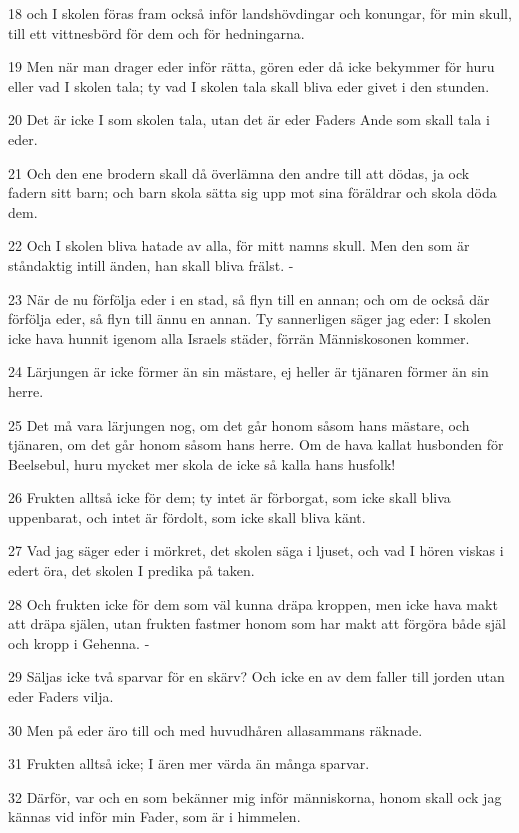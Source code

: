 \par 18 och I skolen föras fram också inför landshövdingar och konungar, för min skull, till ett vittnesbörd för dem och för hedningarna.
\par 19 Men när man drager eder inför rätta, gören eder då icke bekymmer för huru eller vad I skolen tala; ty vad I skolen tala skall bliva eder givet i den stunden.
\par 20 Det är icke I som skolen tala, utan det är eder Faders Ande som skall tala i eder.
\par 21 Och den ene brodern skall då överlämna den andre till att dödas, ja ock fadern sitt barn; och barn skola sätta sig upp mot sina föräldrar och skola döda dem.
\par 22 Och I skolen bliva hatade av alla, för mitt namns skull. Men den som är ståndaktig intill änden, han skall bliva frälst. -
\par 23 När de nu förfölja eder i en stad, så flyn till en annan; och om de också där förfölja eder, så flyn till ännu en annan. Ty sannerligen säger jag eder: I skolen icke hava hunnit igenom alla Israels städer, förrän Människosonen kommer.
\par 24 Lärjungen är icke förmer än sin mästare, ej heller är tjänaren förmer än sin herre.
\par 25 Det må vara lärjungen nog, om det går honom såsom hans mästare, och tjänaren, om det går honom såsom hans herre. Om de hava kallat husbonden för Beelsebul, huru mycket mer skola de icke så kalla hans husfolk!
\par 26 Frukten alltså icke för dem; ty intet är förborgat, som icke skall bliva uppenbarat, och intet är fördolt, som icke skall bliva känt.
\par 27 Vad jag säger eder i mörkret, det skolen säga i ljuset, och vad I hören viskas i edert öra, det skolen I predika på taken.
\par 28 Och frukten icke för dem som väl kunna dräpa kroppen, men icke hava makt att dräpa själen, utan frukten fastmer honom som har makt att förgöra både själ och kropp i Gehenna. -
\par 29 Säljas icke två sparvar för en skärv? Och icke en av dem faller till jorden utan eder Faders vilja.
\par 30 Men på eder äro till och med huvudhåren allasammans räknade.
\par 31 Frukten alltså icke; I ären mer värda än många sparvar.
\par 32 Därför, var och en som bekänner mig inför människorna, honom skall ock jag kännas vid inför min Fader, som är i himmelen.
